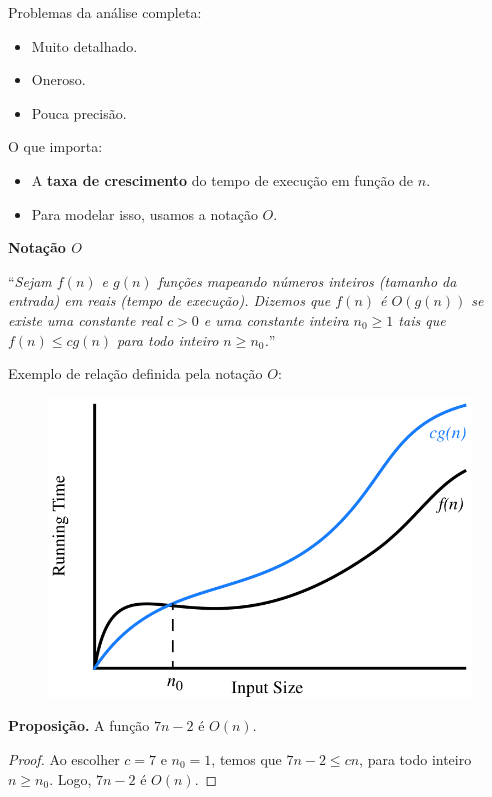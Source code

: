 
Problemas da análise completa:
\begin{itemize}
	\item Muito detalhado.
	\item Oneroso. 
	\item Pouca precisão. 
\end{itemize}

\clearpage

O que importa:
\begin{itemize}
	\item A \textbf{taxa de crescimento} do tempo de execução em função de $n$.
	\item Para modelar isso, usamos a notação $O$.
\end{itemize}

\medskip

\textbf{Notação $O$}

{\color{redtext}

``\textit{Sejam $f(n)$ e $g(n)$ funções mapeando números inteiros (tamanho da entrada) em reais (tempo de execução). Dizemos que $f(n)$ é $O(g(n))$ se existe uma constante real $c > 0$ e uma constante inteira $n_0 \ge 1$ tais que $f(n) \le cg(n)$ para todo inteiro $n \ge n_0$.}''

Exemplo de relação definida pela notação $O$:

\begin{figure}[H]
	\centering
	\includegraphics[width=0.55\linewidth]{img/exemplo-o}
\end{figure}

\textbf{Proposição.} A função $7n - 2$ é $O(n)$.

\begin{proof}
Ao escolher $c = 7$ e $n_0 = 1$, temos que $7n - 2 \le cn$, para todo inteiro $n \ge n_0$. Logo, $7n - 2$ é $O(n)$.
\end{proof}

}

